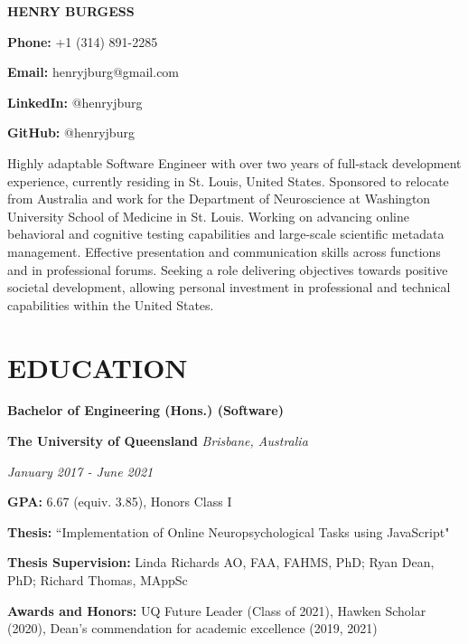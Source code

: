 \documentclass{article}
\begin{document}
  {\Huge\textbf{\uppercase{Henry Burgess}}} \hfill \begin{minipage}{0.26\linewidth}

  \textbf{Phone:} \hfill +1 (314) 891-2285

  \textbf{Email:} \hfill henryjburg@gmail.com

  \textbf{LinkedIn:} \hfill @henryjburg

  \textbf{GitHub:} \hfill @henryjburg

  \end{minipage}

  \medbreak

  Highly adaptable Software Engineer with over two years of full-stack development experience, currently residing in St. Louis, United States.
  Sponsored to relocate from Australia and work for the Department of Neuroscience at Washington University School of Medicine in St. Louis.
  Working on advancing online behavioral and cognitive testing capabilities and large-scale scientific metadata management. Effective presentation and communication skills across functions and in professional forums.
  Seeking a role delivering objectives towards positive societal development, allowing personal investment in professional and technical capabilities within the United States.

  \section*{\centering\uppercase{Education}}

  {\large\textbf{Bachelor of Engineering (Hons.) (Software)}}

  \medbreak

  \textbf{The University of Queensland} \hfill \textit{Brisbane, Australia}

  \textit{January 2017 - June 2021}

  \textbf{GPA:} 6.67 (equiv. 3.85), Honors Class I

  \textbf{Thesis:} ``Implementation of Online Neuropsychological Tasks using JavaScript"

  \textbf{Thesis Supervision:} Linda Richards AO, FAA, FAHMS, PhD; Ryan Dean, PhD; Richard Thomas, MAppSc

  \textbf{Awards and Honors:} UQ Future Leader (Class of 2021), Hawken Scholar (2020), Dean's commendation for academic excellence (2019, 2021)

  \medbreak
\end{document}
